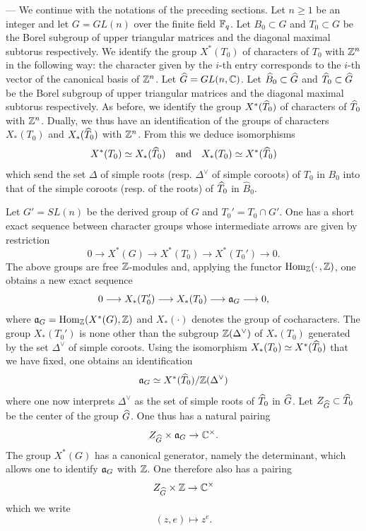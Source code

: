 \begin{paragr} ---\label{S:reg-enonce}
We continue with the notations of the preceding sections. Let $n\geq 1$ be an integer and let $G=GL(n)$ over the finite field $\mathbb{F}_q$. Let $B_0\subset G$ and $T_0\subset G$ be the Borel subgroup of upper triangular matrices and the diagonal maximal subtorus respectively. We identify the group $X^*(T_0)$ of characters of $T_0$ with $\mathbb{Z}^n$ in the following way: the character given by the $i$-th entry corresponds to the $i$-th vector of the canonical basis of $\mathbb{Z}^n$. Let $\widehat{G}=GL(n,\mathbb{C})$. Let $\widehat{B}_0\subset \widehat{G}$ and $\widehat{T}_0\subset \widehat{G}$ be the Borel subgroup of upper triangular matrices and the diagonal maximal subtorus respectively. As before, we identify the group $X^*(\widehat{T}_0)$ of characters of $\widehat{T}_0$ with $\mathbb{Z}^n$. Dually, we thus have an identification of the groups of characters $X_*(T_0)$ and $X_*(\widehat{T}_0)$ with $\mathbb{Z}^n$. From this we deduce isomorphisms
$$X^*(T_0)\simeq X_*(\widehat{T}_0) \quad \text{and} \quad X_*(T_0)\simeq X^*(\widehat{T}_0)$$
which send the set $\Delta$ of simple roots (resp. $\Delta^\vee$ of simple coroots) of $T_0$ in $B_0$ into that of the simple coroots (resp. of the roots) of $\widehat{T}_0$ in $\widehat{B}_0$.

Let $G'=SL(n)$ be the derived group of $G$ and $T_0'=T_0\cap G'$. One has a short exact sequence between character groups whose intermediate arrows are given by restriction
$$0\longrightarrow X^*(G) \longrightarrow X^*(T_0) \longrightarrow X^*(T_0')\longrightarrow 0.$$
The above groups are free $\mathbb{Z}$-modules and, applying the functor $\operatorname{Hom}_{\mathbb{Z}}(\cdot\,,\mathbb{Z})$, one obtains a new exact sequence
$$0\longrightarrow X_*(T_0') \longrightarrow X_*(T_0) \longrightarrow \mathfrak{a}_G\longrightarrow 0,$$
where $\mathfrak{a}_G=\operatorname{Hom}_{\mathbb{Z}}(X^*(G),\mathbb{Z})$ and $X_*(\cdot)$ denotes the group of cocharacters. The group $X_*(T_0')$ is none other than the subgroup $\mathbb{Z}(\Delta^\vee)$ of $X_*(T_0)$ generated by the set $\Delta^\vee$ of simple coroots. Using the isomorphism $X_*(T_0)\simeq X^*(\widehat{T}_0)$ that we have fixed, one obtains an identification
$$\mathfrak{a}_G\simeq X^*(\widehat{T}_0)/\mathbb{Z}(\Delta^\vee)$$
where one now interprets $\Delta^\vee$ as the set of simple roots of $\widehat{T}_0$ in $\widehat{G}$. Let $Z_{\widehat{G}}\subset \widehat{T}_0$ be the center of the group $\widehat{G}$. One thus has a natural pairing
$$Z_{\widehat{G}}\times \mathfrak{a}_G\to \mathbb{C}^\times.$$
The group $X^*(G)$ has a canonical generator, namely the determinant, which allows one to identify $\mathfrak{a}_G$ with $\mathbb{Z}$. One therefore also has a pairing
$$Z_{\widehat{G}}\times \mathbb{Z}\to \mathbb{C}^\times$$
which we write
$$(z,e)\mapsto z^e.$$


\end{paragr}
